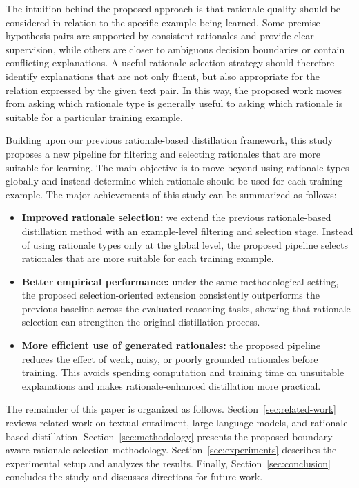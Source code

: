 \documentclass[11pt]{article}
\begin{document}
The intuition behind the proposed approach is that rationale quality should be considered in relation to the specific example being learned. Some premise-hypothesis pairs are supported by consistent rationales and provide clear supervision, while others are closer to ambiguous decision boundaries or contain conflicting explanations. A useful rationale selection strategy should therefore identify explanations that are not only fluent, but also appropriate for the relation expressed by the given text pair. In this way, the proposed work moves from asking which rationale type is generally useful to asking which rationale is suitable for a particular training example.

Building upon our previous rationale-based distillation framework, this study proposes a new pipeline for filtering and selecting rationales that are more suitable for learning. The main objective is to move beyond using rationale types globally and instead determine which rationale should be used for each training example. The major achievements of this study can be summarized as follows:

\begin{itemize}
    \item \textbf{Improved rationale selection:} we extend the previous rationale-based distillation method with an example-level filtering and selection stage. Instead of using rationale types only at the global level, the proposed pipeline selects rationales that are more suitable for each training example.
    \item \textbf{Better empirical performance:} under the same methodological setting, the proposed selection-oriented extension consistently outperforms the previous baseline across the evaluated reasoning tasks, showing that rationale selection can strengthen the original distillation process.
    \item \textbf{More efficient use of generated rationales:} the proposed pipeline reduces the effect of weak, noisy, or poorly grounded rationales before training. This avoids spending computation and training time on unsuitable explanations and makes rationale-enhanced distillation more practical.
\end{itemize}

The remainder of this paper is organized as follows. Section~\ref{sec:related-work} reviews related work on textual entailment, large language models, and rationale-based distillation. Section~\ref{sec:methodology} presents the proposed boundary-aware rationale selection methodology. Section~\ref{sec:experiments} describes the experimental setup and analyzes the results. Finally, Section~\ref{sec:conclusion} concludes the study and discusses directions for future work.
\end{document}
